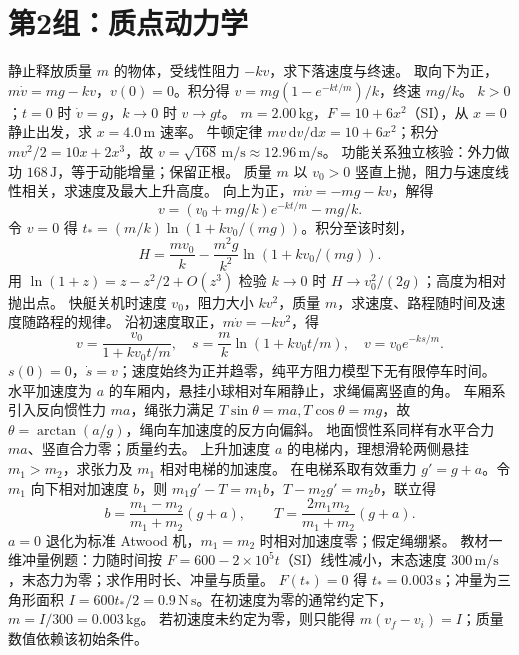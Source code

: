\section{第2组：质点动力学}
\problemtext 静止释放质量 $m$ 的物体，受线性阻力 $-kv$，求下落速度与终速。
\workings 取向下为正，$m\dot v=mg-kv$，$v(0)=0$。积分得 $v=mg(1-e^{-kt/m})/k$，终速 $mg/k$。
\crosscheck $k>0$；$t=0$ 时 $\dot v=g$，$k\to0$ 时 $v\to gt$。
\problemtext $m=2.00\,\mathrm{kg}$，$F=10+6x^2$（SI），从 $x=0$ 静止出发，求 $x=4.0\,\mathrm m$ 速率。
\workings 牛顿定律 $mv\,\mathrm dv/\mathrm dx=10+6x^2$；积分 $mv^2/2=10x+2x^3$，故 $v=\sqrt{168}\,\mathrm{m/s}\approx12.96\,\mathrm{m/s}$。
\crosscheck 功能关系独立核验：外力做功 $168\,\mathrm J$，等于动能增量；保留正根。
\problemtext 质量 $m$ 以 $v_0>0$ 竖直上抛，阻力与速度线性相关，求速度及最大上升高度。
\workings 向上为正，$m\dot v=-mg-kv$，解得
\[
v=(v_0+mg/k)e^{-kt/m}-mg/k.
\]
令 $v=0$ 得 $t_*=(m/k)\ln(1+kv_0/(mg))$。积分至该时刻，
\[
H=\frac{mv_0}{k}-\frac{m^2g}{k^2}\ln(1+kv_0/(mg)).
\]
\crosscheck 用 $\ln(1+z)=z-z^2/2+O(z^3)$ 检验 $k\to0$ 时 $H\to v_0^2/(2g)$；高度为相对抛出点。
\problemtext 快艇关机时速度 $v_0$，阻力大小 $kv^2$，质量 $m$，求速度、路程随时间及速度随路程的规律。
\workings 沿初速度取正，$m\dot v=-kv^2$，得
\[
v=\frac{v_0}{1+kv_0t/m},\quad
s=\frac mk\ln(1+kv_0t/m),\quad v=v_0e^{-ks/m}.
\]
\crosscheck $s(0)=0$，$\dot s=v$；速度始终为正并趋零，纯平方阻力模型下无有限停车时间。
\problemtext 水平加速度为 $a$ 的车厢内，悬挂小球相对车厢静止，求绳偏离竖直的角。
\workings 车厢系引入反向惯性力 $ma$，绳张力满足 $T\sin\theta=ma,T\cos\theta=mg$，故 $\theta=\arctan(a/g)$，绳向车加速度的反方向偏斜。
\crosscheck 地面惯性系同样有水平合力 $ma$、竖直合力零；质量约去。
\problemtext 上升加速度 $a$ 的电梯内，理想滑轮两侧悬挂 $m_1>m_2$，求张力及 $m_1$ 相对电梯的加速度。
\workings 在电梯系取有效重力 $g'=g+a$。令 $m_1$ 向下相对加速度 $b$，则 $m_1g'-T=m_1b$，$T-m_2g'=m_2b$，联立得
\[
b=\frac{m_1-m_2}{m_1+m_2}(g+a),\qquad
T=\frac{2m_1m_2}{m_1+m_2}(g+a).
\]
\crosscheck $a=0$ 退化为标准 Atwood 机，$m_1=m_2$ 时相对加速度零；假定绳绷紧。
\problemtext 教材一维冲量例题：力随时间按 $F=600-2\times10^5t$（SI）线性减小，末态速度 $300\,\mathrm{m/s}$，末态力为零；求作用时长、冲量与质量。
\workings $F(t_*)=0$ 得 $t_*=0.003\,\mathrm s$；冲量为三角形面积 $I=600t_*/2=0.9\,\mathrm{N\,s}$。在初速度为零的通常约定下，$m=I/300=0.003\,\mathrm{kg}$。
\crosscheck 若初速度未约定为零，则只能得 $m(v_f-v_i)=I$；质量数值依赖该初始条件。
